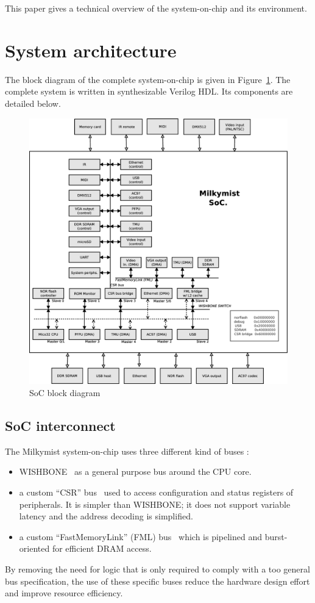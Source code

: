 \documentclass[a4paper,11pt,twocolumn]{paper}
\begin{document}
This paper gives a technical overview of the system-on-chip and its environment.

\section{System architecture}
The block diagram of the complete system-on-chip is given in Figure~\ref{fig:block}. The complete system is written in synthesizable Verilog HDL. Its components are detailed below.
\begin{figure}
\centering
\includegraphics[width=\textwidth]{soc_architecture.eps}
\caption{SoC block diagram}
\label{fig:block}
\end{figure}

\subsection{SoC interconnect}
The Milkymist system-on-chip uses three different kind of buses :
\begin{itemize}
\item WISHBONE~\cite{wishbone} as a general purpose bus around the CPU core.
\item a custom ``CSR'' bus~\cite{csr} used to access configuration and status registers of peripherals. It is simpler than WISHBONE; it does not support variable latency and the address decoding is simplified.
\item a custom ``FastMemoryLink'' (FML) bus~\cite{fml} which is pipelined and burst-oriented for efficient DRAM access.
\end{itemize}
By removing the need for logic that is only required to comply with a too general bus specification, the use of these specific buses reduce the hardware design effort and improve resource efficiency.
\end{document}
